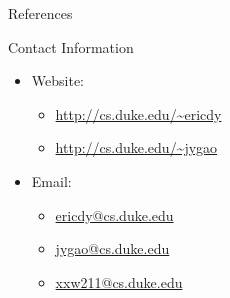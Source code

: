 \documentclass[final]{beamer}
\newlength{\onecolwid}
\begin{document}
\begin{frame}[t]
\begin{columns}[t]
\begin{column}{\onecolwid}
\begin{block}{References}
\end{block}








\begin{alertblock}{Contact Information}

\begin{itemize}
\item Website: 
    \begin{itemize}
        \item \href{http://cs.duke.edu/~ericdy}{\url{http://cs.duke.edu/~ericdy}}
        \item \href{http://cs.duke.edu/~jygao}{\url{http://cs.duke.edu/~jygao}}
    \end{itemize}
\item Email: 
    \begin{itemize}
        \item \href{mailto:ericdy@cs.duke.edu}{ericdy@cs.duke.edu}
        \item \href{mailto:jygao@cs.duke.edu}{jygao@cs.duke.edu}
        \item \href{mailto:xxw211@cs.duke.edu}{xxw211@cs.duke.edu}
    \end{itemize}
\end{itemize}


\end{alertblock}
\end{column}
\end{columns}
\end{frame}
\end{document}
